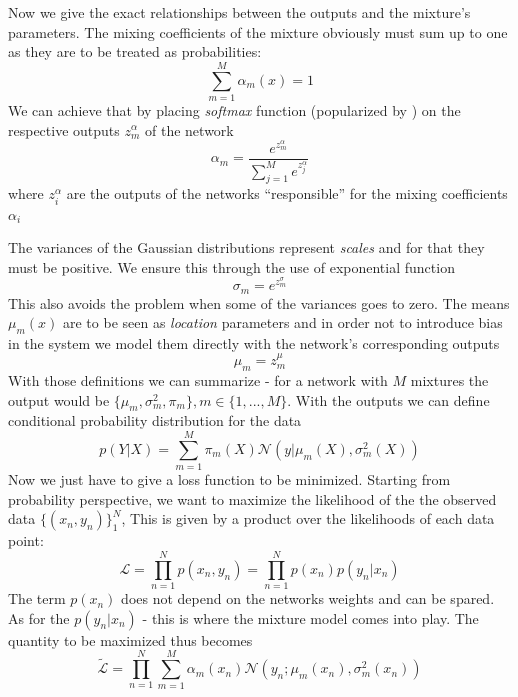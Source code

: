 \documentclass[12pt,a4paper,twoside]{scrartcl}
\numberwithin{equation}{section}
\begin{document}
Now we give the exact relationships between the outputs and the mixture's parameters. The mixing coefficients of the mixture obviously must sum up to one as they are to be treated as probabilities:
\begin{equation}
\sum_{m=1}^M\alpha_m(x)=1
\end{equation}
We can achieve that by placing \emph{softmax} function (popularized by \cite{bridle1990}) on the respective outputs \(z_m^{\alpha} \) of the network 
\begin{equation}
 \alpha_m = \frac{e^{z_m^{\alpha}}}{\sum_{j=1}^M e^{z_j^{\alpha}}}
\end{equation}
where \(z_i^{\alpha}\) are the outputs of the networks ``responsible'' for the mixing coefficients \(\alpha_i\) 

The variances of the Gaussian distributions represent \emph{scales} and for that they must be positive. We ensure this through the use of exponential function
\begin{equation}
  \sigma_m = e^{z_m^{\sigma}}
\end{equation}
This also avoids the problem when some of the variances goes to zero. The means \(\mu_m(x)\) are to be seen as \emph{location} parameters and in order not to introduce bias in the system we model them directly with the network's corresponding outputs
\begin{equation}
  \mu_m = z_m^{\mu} 
\end{equation}
With those definitions we can summarize - for a network with \(M\) mixtures the output would be \(\{\mu_m, \sigma_m^2, \pi_m \}, m\in\{1,...,M\}\). With the outputs we can define conditional probability distribution for the data
\begin{equation}
  p(Y|X) = \sum_{m=1}^M \pi_m(X)\mathcal{N}(y|\mu_m(X), \sigma_m^2(X))
\end{equation}
Now we just have to give a loss function to be minimized. Starting from probability perspective, we want to maximize the likelihood of the the observed data \(\{(x_n, y_n)\}_1^N\), This is given by a product over the likelihoods of each data point:
\begin{equation}
  \mathcal{L} = \prod_{n=1}^N p(x_n, y_n) = \prod_{n=1}^N p(x_n)p(y_n | x_n)
\end{equation}
The term \(p(x_n)\) does not depend on the networks weights and can be spared. As for the \(p(y_n | x_n)\) - this is where the mixture model comes into play. The quantity to be maximized thus becomes
\begin{equation}
  \tilde{\mathcal{L}} =  \prod_{n=1}^N \sum_{m=1}^M \alpha_m(x_n)\mathcal{N}(y_n; \mu_m(x_n), \sigma_m^2(x_n))
\end{equation}
\end{document}
